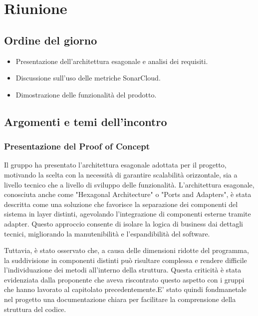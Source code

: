 \section{Riunione}
\subsection{Ordine del giorno}
\begin{itemize}
    \item Presentazione dell'architettura esagonale e analisi dei requisiti.
    \item Discussione sull'uso delle metriche SonarCloud.
    \item Dimostrazione delle funzionalità del prodotto.
\end{itemize}

\subsection{Argomenti e temi dell'incontro}

\subsubsection{Presentazione del Proof of Concept}

\par Il gruppo ha presentato l'architettura esagonale adottata per il progetto, motivando la scelta con la necessità di garantire scalabilità orizzontale, sia a livello tecnico che a livello di sviluppo delle funzionalità. L'architettura esagonale, conosciuta anche come "Hexagonal Architecture" o "Ports and Adapters", è stata descritta come una soluzione che favorisce la separazione dei componenti del sistema in layer distinti, agevolando l'integrazione di componenti esterne tramite adapter. Questo approccio consente di isolare la logica di business dai dettagli tecnici, migliorando la manutenibilità e l'espandibilità del software.

\par Tuttavia, è stato osservato che, a causa delle dimensioni ridotte del programma, la suddivisione in componenti distinti può risultare complessa e rendere difficile l'individuazione dei metodi all'interno della struttura. Questa criticità è stata evidenziata dalla proponente che aveva riscontrato questo aspetto con i gruppi che hanno lavorato al capitolato precedentemente.E' stato quindi fondmanetale nel progetto una documentazione chiara per facilitare la comprensione della struttura del codice.

